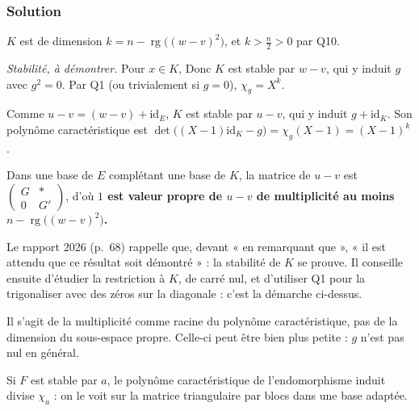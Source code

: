 \documentclass[11pt,a4paper]{article}
\newcommand{\equationajustee}[1]{%
  \sbox{\boiteequation}{$\displaystyle #1$}%
  \ifdim\wd\boiteequation>\linewidth
    \[\resizebox{\linewidth}{!}{\usebox{\boiteequation}}\]%
  \else
    \[#1\]%
  \fi}
\begin{document}
\hypertarget{solution-10}{%
\subsubsection{Solution}\label{solution-10}}

\(K\) est de dimension \(k=n-\operatorname{rg}\big((w-v)^2\big)\), et \(k>\frac n2>0\) par Q10.

\emph{Stabilité, à démontrer.} Pour \(x\in K\),
\equationajustee{(w-v)^2\big((w-v)x\big)=(w-v)\big((w-v)^2x\big)=0.}
Donc \(K\) est stable par \(w-v\), qui y induit \(g\) avec \(g^2=0\). Par Q1 (ou trivialement si \(g=0\)), \(\chi_g=X^k\).

Comme \(u-v=(w-v)+{\mathrm{id}}_E\), \(K\) est stable par \(u-v\), qui y induit \(g+{\mathrm{id}}_K\). Son polynôme caractéristique est \(\det\big((X-1){\mathrm{id}}_K-g\big)=\chi_g(X-1)=(X-1)^k\).

Dans une base de \(E\) complétant une base de \(K\), la matrice de \(u-v\) est \(\begin{pmatrix}G&\ast\\0&G'\end{pmatrix}\), d'où
\equationajustee{\chi_{u-v}=(X-1)^k\chi_{G'}.}
\textbf{\(1\) est valeur propre de \(u-v\) de multiplicité au moins \(n-\operatorname{rg}\big((w-v)^2\big)\).}

\begin{jury}

Le rapport 2026 (p.~68) rappelle que, devant « en remarquant que », « il est attendu que ce résultat soit démontré » : la stabilité de \(K\) se prouve. Il conseille ensuite d'étudier la restriction à \(K\), de carré nul, et d'utiliser Q1 pour la trigonaliser avec des zéros sur la diagonale : c'est la démarche ci-dessus.

\end{jury}

\begin{piege}

Il s'agit de la multiplicité comme racine du polynôme caractéristique, pas de la dimension du sous-espace propre. Celle-ci peut être bien plus petite : \(g\) n'est pas nul en général.

\end{piege}

\begin{methode}

Si \(F\) est stable par \(a\), le polynôme caractéristique de l'endomorphisme induit divise \(\chi_a\) : on le voit sur la matrice triangulaire par blocs dans une base adaptée.

\end{methode}
\end{document}
